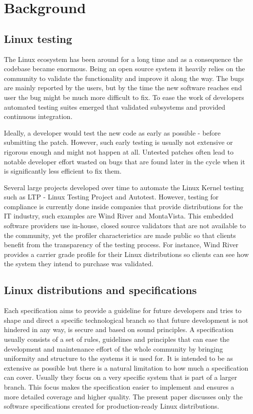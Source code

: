 \chapter{Background}

\section{Linux testing}

The Linux ecosystem has been around for a long time and as a consequence the codebase became enormous. Being an open source system it heavily relies on the community to validate the functionality and improve it along the way. The bugs are mainly reported by the users, but by the time the new software reaches end user the bug might be much more difficult to fix. To ease the work of developers automated testing suites emerged that validated subsystems and provided continuous integration.

Ideally, a developer would test the new code as early as possible - before submitting the patch. However, such early testing is usually not extensive or rigorous enough and might not happen at all. Untested patches often lead to notable developer effort wasted on bugs that are found later in the cycle when it is significantly less efficient to fix them.

Several large projects developed over time to automate the Linux Kernel testing such as LTP - Linux Testing Project and Autotest. However, testing for compliance is currently done inside companies that provide distributions for the IT industry, such examples are Wind River and MontaVista. This embedded software providers use in-house, closed source validators that are not available to the community, yet the profiler characteristics are made public so that clients benefit from the transparency of the testing process. For instance, Wind River provides a carrier grade profile for their Linux distributions so clients can see how the system they intend to purchase was validated.

\section{Linux distributions and specifications}

Each specification aims to provide a guideline for future developers and tries to shape and direct a specific technological branch so that future development is not hindered in any way, is secure and based on sound principles. A specification usually consists of a set of rules, guidelines and principles that can ease the development and maintenance effort of the whole community by bringing uniformity and structure to the systems it is used for. It is intended to be as extensive as possible but there is a natural limitation to how much a specification can cover. Usually they focus on a very specific system that is part of a larger branch. This focus makes the specification easier to implement and ensures a more detailed coverage and higher quality. The present paper discusses only the software specifications created for production-ready Linux distributions.

